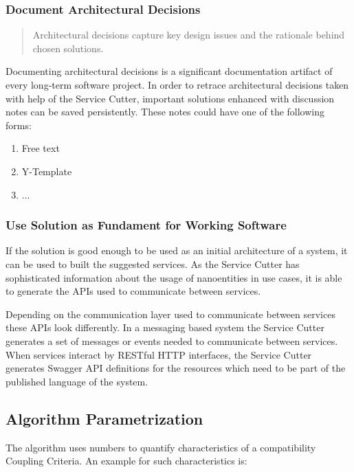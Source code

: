 \subsubsection{Document Architectural Decisions}

\begin{quote}
	Architectural decisions capture key design issues and the rationale behind chosen solutions.\cite{zioAD}
\end{quote}

Documenting architectural decisions is a significant documentation artifact of every long-term software project. In order to retrace architectural decisions taken with help of the Service Cutter, important solutions enhanced with discussion notes can be saved persistently. These notes could have one of the following forms:

\begin{enumerate}
	\item Free text
	\item Y-Template\cite{y-template}
	\item ...
\end{enumerate}

\subsubsection{Use Solution as Fundament for Working Software}

If the solution is good enough to be used as an initial architecture of a system, it can be used to built the suggested services. As the Service Cutter has sophisticated information about the usage of nanoentities in use cases, it is able to generate the APIs used to communicate between services. 

Depending on the communication layer used to communicate between services these APIs look differently. In a messaging based system the Service Cutter generates a set of messages or events needed to communicate between services. When services interact by RESTful HTTP interfaces, the Service Cutter generates Swagger\cite{swagger} API definitions for the resources which need to be part of the published language\cite[p.375]{evans2003domain} of the system. 


\subsection{Algorithm Parametrization}

The algorithm uses numbers to quantify characteristics of a compatibility Coupling Criteria. An example for such characteristics is:

